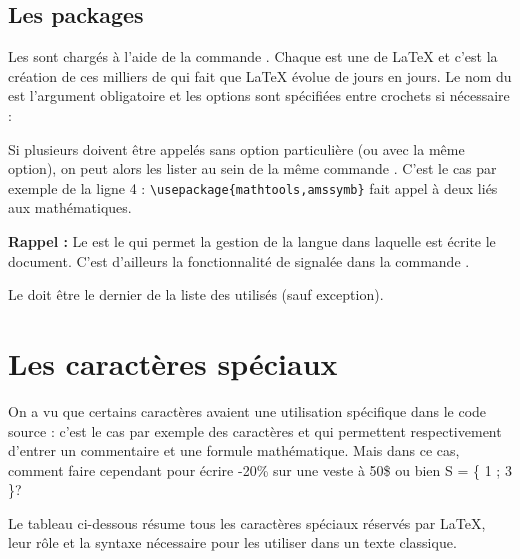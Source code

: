 \subsection{Les packages}

Les  sont chargés à l'aide de la commande . Chaque  est une  de \LaTeX{} et c'est la création de ces milliers de  qui fait que \LaTeX{} évolue de jours en jours. Le nom du  est l'argument obligatoire et les options sont spécifiées entre crochets si nécessaire :
\begin{center}
\end{center}
Si plusieurs  doivent être appelés sans option particulière (ou avec la même option), on peut alors les lister au sein de la même commande . C'est le cas par exemple de la ligne 4 : \verb!\usepackage{mathtools,amssymb}! fait appel à deux  liés aux mathématiques.

\begin{info}
    \textbf{Rappel :} Le   est le  qui permet la gestion de la langue dans laquelle est écrite le document. C'est d'ailleurs la fonctionnalité de  signalée dans la commande .\par
    Le   doit être le dernier de la liste des  utilisés (sauf exception).
\end{info}

\section{Les caractères spéciaux}

On a vu que certains caractères avaient une utilisation spécifique dans le code source : c'est le cas par exemple des caractères \ordi{\%} et \ordi{\$} qui permettent respectivement d'entrer un commentaire et une formule mathématique. Mais dans ce cas, comment faire cependant pour écrire -20\% sur une veste à 50\$ ou bien S = \{ 1 ; 3 \}?\par
Le tableau ci-dessous résume tous les caractères spéciaux réservés par \LaTeX{}, leur rôle et la syntaxe nécessaire pour les utiliser dans un texte classique.

